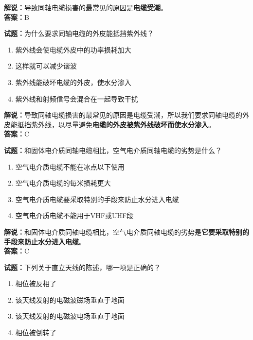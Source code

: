 \documentclass{ctexbook}
\begin{document}
\noindent\textbf{解说：}导致同轴电缆损害的最常见的原因是\textbf{电缆受潮}。\\\noindent\textbf{答案：}B


\bigskip


\noindent\textbf{试题：}为什么要求同轴电缆的外皮能抵挡紫外线？

\begin{enumerate}[leftmargin=3em]
	
	\item 紫外线会使电缆外皮中的功率损耗加大
	\item 这样就可以减少谐波
	\item 紫外线能破坏电缆的外皮，使水分渗入
	\item 紫外线和射频信号会混合在一起导致干扰
\end{enumerate}

\noindent\textbf{解说：}导致同轴电缆损害的最常见的原因是电缆受潮，所以我们要求同轴电缆的外皮能抵挡紫外线，以尽量避免\textbf{电缆的外皮被紫外线破坏而使水分渗入}。\\\noindent\textbf{答案：}C%


\bigskip


\noindent\textbf{试题：}和固体电介质同轴电缆相比，空气电介质同轴电缆的劣势是什么？

\begin{enumerate}[leftmargin=3em]
	\item 空气电介质电缆不能在冰点以下使用
	\item 空气电介质电缆的每米损耗更大
	\item 空气电介质电缆要采取特别的手段来防止水分进入电缆
	\item 空气电介质电缆不能用于VHF或UHF段
\end{enumerate}

\noindent\textbf{解说：}和固体电介质同轴电缆相比，空气电介质同轴电缆的劣势是\textbf{它要采取特别的手段来防止水分进入电缆}。\\\noindent\textbf{答案：}C%


\bigskip


\noindent\textbf{试题：}下列关于直立天线的陈述，哪一项是正确的？

\begin{enumerate}[leftmargin=3em]
	\item 相位被反相了
	\item 该天线发射的电磁波磁场垂直于地面
	\item 该天线发射的电磁波电场垂直于地面
	\item 相位被倒转了
\end{enumerate}
\end{document}
